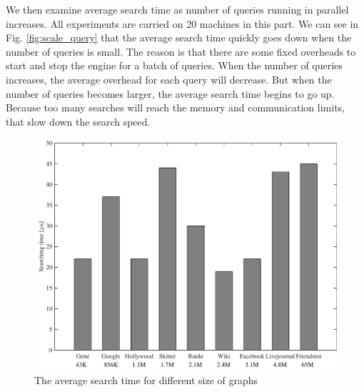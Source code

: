 
We then examine average search time as number of queries running in parallel increases. All experiments are carried on 20 machines in this part. We can see in Fig. \ref{fig:scale_query} that the average search time quickly goes down when the number of queries is small. The reason is that there are some fixed overheads to start and stop the engine for a batch of queries. When the number of queries increases, the average overhead for each query will decrease. But when the number of queries becomes larger, the average search time begins to go up.  Because too many searches will reach the memory and communication limits, that slow down the search speed.

\begin{figure}[t]
    \centering
    \includegraphics[width=\linewidth]{../figures/scale_graph.pdf}
    \caption{The average search time for different size of graphs}
    \label{fig:scale_graph}
\end{figure}


